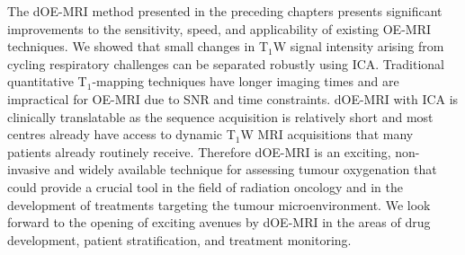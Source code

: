 The \acs{dOE-MRI} method presented in the preceding chapters presents significant improvements to the sensitivity, speed, and applicability of existing \acs{OE-MRI} techniques. 
We showed that small changes in T$_1$W signal intensity arising from cycling respiratory challenges can be separated robustly using \acs{ICA}. 
Traditional quantitative T$_1$-mapping techniques have longer imaging times and are impractical for \acs{OE-MRI} due to \acs{SNR} and time constraints.
\acs{dOE-MRI} with \acs{ICA} is clinically translatable as the sequence acquisition is relatively short and most centres already have access to dynamic T$_1$W MRI acquisitions that many patients already routinely receive. 
Therefore \acs{dOE-MRI} is an exciting, non-invasive and widely available technique for assessing tumour oxygenation that could provide a crucial tool in the field of radiation oncology and in the development of treatments targeting the tumour microenvironment.
We look forward to the opening of exciting avenues by \acs{dOE-MRI} in the areas of drug development, patient stratification, and treatment monitoring. 


\endinput